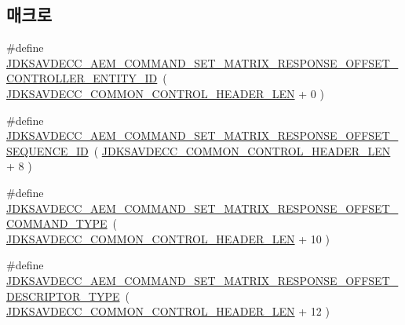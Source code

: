 \subsection*{매크로}
\begin{DoxyCompactItemize}
\item 
\#define \hyperlink{group__command__set__matrix__response_gaf2fc16d2af45786f0e2af521a52504bc}{J\+D\+K\+S\+A\+V\+D\+E\+C\+C\+\_\+\+A\+E\+M\+\_\+\+C\+O\+M\+M\+A\+N\+D\+\_\+\+S\+E\+T\+\_\+\+M\+A\+T\+R\+I\+X\+\_\+\+R\+E\+S\+P\+O\+N\+S\+E\+\_\+\+O\+F\+F\+S\+E\+T\+\_\+\+C\+O\+N\+T\+R\+O\+L\+L\+E\+R\+\_\+\+E\+N\+T\+I\+T\+Y\+\_\+\+ID}~( \hyperlink{group__jdksavdecc__avtp__common__control__header_gaae84052886fb1bb42f3bc5f85b741dff}{J\+D\+K\+S\+A\+V\+D\+E\+C\+C\+\_\+\+C\+O\+M\+M\+O\+N\+\_\+\+C\+O\+N\+T\+R\+O\+L\+\_\+\+H\+E\+A\+D\+E\+R\+\_\+\+L\+EN} + 0 )
\item 
\#define \hyperlink{group__command__set__matrix__response_ga8845b2e3e68c4199153e3bacac3f7f03}{J\+D\+K\+S\+A\+V\+D\+E\+C\+C\+\_\+\+A\+E\+M\+\_\+\+C\+O\+M\+M\+A\+N\+D\+\_\+\+S\+E\+T\+\_\+\+M\+A\+T\+R\+I\+X\+\_\+\+R\+E\+S\+P\+O\+N\+S\+E\+\_\+\+O\+F\+F\+S\+E\+T\+\_\+\+S\+E\+Q\+U\+E\+N\+C\+E\+\_\+\+ID}~( \hyperlink{group__jdksavdecc__avtp__common__control__header_gaae84052886fb1bb42f3bc5f85b741dff}{J\+D\+K\+S\+A\+V\+D\+E\+C\+C\+\_\+\+C\+O\+M\+M\+O\+N\+\_\+\+C\+O\+N\+T\+R\+O\+L\+\_\+\+H\+E\+A\+D\+E\+R\+\_\+\+L\+EN} + 8 )
\item 
\#define \hyperlink{group__command__set__matrix__response_ga9589391f6659b38fd4a521a3961d15ce}{J\+D\+K\+S\+A\+V\+D\+E\+C\+C\+\_\+\+A\+E\+M\+\_\+\+C\+O\+M\+M\+A\+N\+D\+\_\+\+S\+E\+T\+\_\+\+M\+A\+T\+R\+I\+X\+\_\+\+R\+E\+S\+P\+O\+N\+S\+E\+\_\+\+O\+F\+F\+S\+E\+T\+\_\+\+C\+O\+M\+M\+A\+N\+D\+\_\+\+T\+Y\+PE}~( \hyperlink{group__jdksavdecc__avtp__common__control__header_gaae84052886fb1bb42f3bc5f85b741dff}{J\+D\+K\+S\+A\+V\+D\+E\+C\+C\+\_\+\+C\+O\+M\+M\+O\+N\+\_\+\+C\+O\+N\+T\+R\+O\+L\+\_\+\+H\+E\+A\+D\+E\+R\+\_\+\+L\+EN} + 10 )
\item 
\#define \hyperlink{group__command__set__matrix__response_gab7d18dbe7b67add857dffdf7ecf21846}{J\+D\+K\+S\+A\+V\+D\+E\+C\+C\+\_\+\+A\+E\+M\+\_\+\+C\+O\+M\+M\+A\+N\+D\+\_\+\+S\+E\+T\+\_\+\+M\+A\+T\+R\+I\+X\+\_\+\+R\+E\+S\+P\+O\+N\+S\+E\+\_\+\+O\+F\+F\+S\+E\+T\+\_\+\+D\+E\+S\+C\+R\+I\+P\+T\+O\+R\+\_\+\+T\+Y\+PE}~( \hyperlink{group__jdksavdecc__avtp__common__control__header_gaae84052886fb1bb42f3bc5f85b741dff}{J\+D\+K\+S\+A\+V\+D\+E\+C\+C\+\_\+\+C\+O\+M\+M\+O\+N\+\_\+\+C\+O\+N\+T\+R\+O\+L\+\_\+\+H\+E\+A\+D\+E\+R\+\_\+\+L\+EN} + 12 )
\item 

\end{DoxyCompactItemize}
